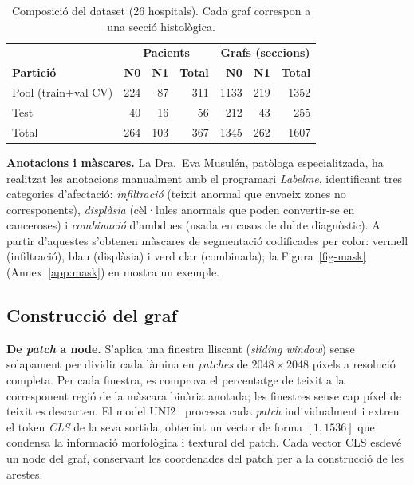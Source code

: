 \documentclass[10pt,a4paper,twocolumn,twoside]{article}
\begin{document}
\begin{table}[t]
\centering
\caption{Composició del dataset (26 hospitals). Cada graf correspon a una secció histològica.}
\label{tab:dataset}
\small
\begin{tabular}{lrrr|rrr}
\toprule
 & \multicolumn{3}{c|}{\textbf{Pacients}} & \multicolumn{3}{c}{\textbf{Grafs (seccions)}} \\
\textbf{Partició} & \textbf{N0} & \textbf{N1} & \textbf{Total} & \textbf{N0} & \textbf{N1} & \textbf{Total} \\
\midrule
Pool (train+val CV) & 224 &  87 & 311 & 1133 & 219 & 1352 \\
Test                &  40 &  16 &  56 &   212  &  43 &   255  \\
\midrule
Total & 264 & 103 & 367 & 1345 & 262 & 1607 \\
\bottomrule
\end{tabular}
\end{table}

\textbf{Anotacions i màscares.}
\label{sec:anotacions-masques}
La Dra.\ Eva Musulén, patòloga especialitzada, ha realitzat les anotacions manualment amb el programari
\textit{Labelme}, identificant tres categories d'afectació: \textit{infiltració} (teixit anormal que
envaeix zones no corresponents), \textit{displàsia} (cèl·lules anormals que poden convertir-se en
canceroses) i \textit{combinació} d'ambdues (usada en casos de dubte diagnòstic). A partir d'aquestes
s'obtenen màscares de segmentació codificades per color: vermell (infiltració), blau (displàsia) i verd
clar (combinada); la Figura~\ref{fig-mask} (Annex~\ref{app:mask}) en mostra un exemple.

\subsection{Construcció del graf}

\textbf{De \textit{patch} a node.} S'aplica una finestra lliscant (\textit{sliding window}) sense solapament
per dividir cada làmina en
\textit{patches} de $2048 \times 2048$ píxels a resolució completa. Per cada finestra, es comprova el
percentatge de teixit a la corresponent regió de la màscara binària anotada;
les finestres sense cap píxel de teixit es descarten.
El model UNI2~\cite{chen2024uni2} processa cada \textit{patch} individualment i extreu el token
\textit{CLS} de la seva sortida, obtenint un vector de forma $[1, 1536]$ que condensa la
informació morfològica i textural del patch. Cada vector CLS esdevé un node del graf,
conservant les coordenades del patch per a la construcció de les arestes.
\end{document}

